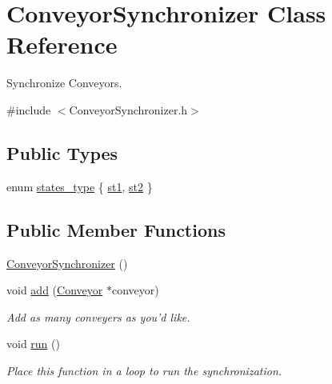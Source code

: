 \hypertarget{classConveyorSynchronizer}{\section{Conveyor\-Synchronizer Class Reference}
\label{classConveyorSynchronizer}
}


Synchronize Conveyors.  




{\ttfamily \#include $<$Conveyor\-Synchronizer.\-h$>$}

\subsection*{Public Types}
\begin{DoxyCompactItemize}
\item 
enum \hyperlink{classConveyorSynchronizer_ad503ce87e58a6567d30daf11bf9b97b5}{states\-\_\-type} \{ \hyperlink{classConveyorSynchronizer_ad503ce87e58a6567d30daf11bf9b97b5ae6a6f6526745c204c0b2be970d0522a2}{st1}, 
\hyperlink{classConveyorSynchronizer_ad503ce87e58a6567d30daf11bf9b97b5a6c75db9fef7dbca83dc368a261065f1a}{st2}
 \}
\end{DoxyCompactItemize}
\subsection*{Public Member Functions}
\begin{DoxyCompactItemize}
\item 
\hyperlink{classConveyorSynchronizer_ae197fb7a2b8b53ec8425e736ed26d508}{Conveyor\-Synchronizer} ()
\item 
void \hyperlink{classConveyorSynchronizer_ae640bf1ee6bbf1f61f2a9430df93fe06}{add} (\hyperlink{classConveyor}{Conveyor} $\ast$conveyor)
\begin{DoxyCompactList}\small\item\em Add as many conveyers as you'd like. \end{DoxyCompactList}\item 
void \hyperlink{classConveyorSynchronizer_ae30b7c917a6522f4ae17d747b9f88ee0}{run} ()
\begin{DoxyCompactList}\small\item\em Place this function in a loop to run the synchronization. \end{DoxyCompactList}\end{DoxyCompactItemize}
